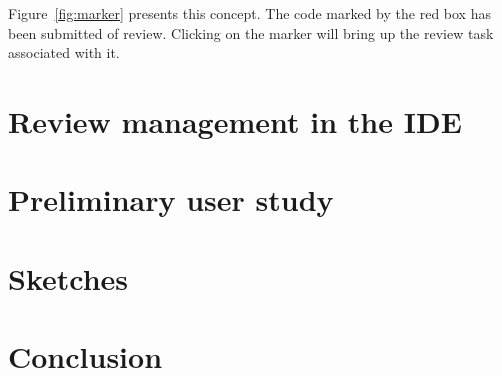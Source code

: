 \documentclass{sigchi}
\begin{document}
Figure~\ref{fig:marker} presents this concept. The code marked by the red box has been submitted of
review. Clicking on the marker will bring up the review task associated with it.

\section{Review management in the IDE}

\section{Preliminary user study}
\section{Sketches}
\section{Conclusion}



\end{document}
